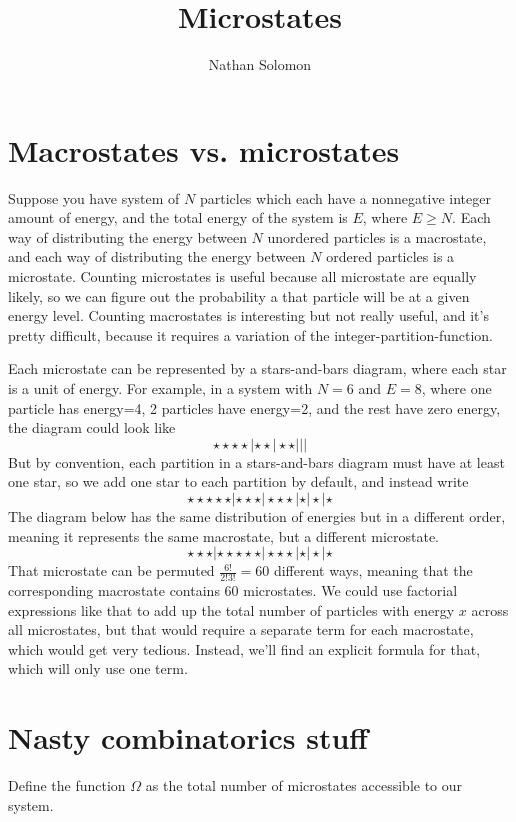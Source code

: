 \documentclass[12pt]{article}
\begin{document}
\title{Microstates}
\author{Nathan Solomon}
\maketitle

\section{Macrostates vs. microstates}
Suppose you have system of $N$ particles which each have a nonnegative integer amount of energy, and the total energy of the system is $E$, where $E \geq N$. Each way of distributing the energy between $N$ unordered particles is a macrostate, and each way of distributing the energy between $N$ ordered particles is a microstate. Counting microstates is useful because all microstate are equally likely, so we can figure out the probability a that particle will be at a given energy level. Counting macrostates is interesting but not really useful, and it's pretty difficult, because it requires a variation of the integer-partition-function.

Each microstate can be represented by a stars-and-bars diagram, where each star is a unit of energy. For example, in a system with $N=6$ and $E=8$, where one particle has energy=4, 2 particles have energy=2, and the rest have zero energy, the diagram could look like
\[\star \star \star \star | \star \star | \star \star | | |\]
But by convention, each partition in a stars-and-bars diagram must have at least one star, so we add one star to each partition by default, and instead write
\[\star \star \star \star \star | \star \star \star | \star \star \star | \star | \star | \star\]
The diagram below has the same distribution of energies but in a different order, meaning it represents the same macrostate, but a different microstate.
\[\star \star \star | \star \star \star \star \star | \star \star \star | \star | \star | \star\]
That microstate can be permuted $\frac{6!}{2!3!} = 60$ different ways, meaning that the corresponding macrostate contains 60 microstates. We could use factorial expressions like that to add up the total number of particles with energy $x$ across all microstates, but that would require a separate term for each macrostate, which would get very tedious. Instead, we'll find an explicit formula for that, which will only use one term.

\section{Nasty combinatorics stuff}
Define the function $\Omega$ as the total number of microstates accessible to our system.
\end{document}

